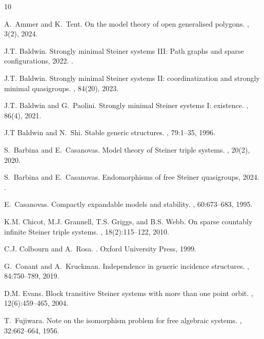 \documentclass[a4paper, 11pt]{article}
\theoremstyle{note}
\begin{document}
\begin{thebibliography}{10}

A.~Ammer and K.~Tent.
\newblock On the model theory of open generalised polygons.
, 3(2), 2024.

J.T. Baldwin.
\newblock Strongly minimal {S}teiner systems {III}: Path graphs and sparse
  configurations, 2022.
  .
  
J.T. Baldwin.
\newblock Strongly minimal {S}teiner systems {II}: coordinatization and
  strongly minimal quasigroups.
, 84(20), 2023.

J.T. Baldwin and G.~Paolini.
\newblock Strongly minimal {S}teiner systems {I}: existence.
, 86(4), 2021.

J.T Baldwin and N.~Shi.
\newblock Stable generic structures.
, 79:1--35, 1996.

S.~Barbina and E.~Casanovas.
\newblock Model theory of {S}teiner triple systems.
, 20(2), 2020.

S.~Barbina and E.~Casanovas.
\newblock Endomorphisms of free {S}teiner quasigroups, 2024.
.

E.~Casanovas.
\newblock Compactly expandable models and stability.
, 60:673--683, 1995.

K.M. Chicot, M.J. Grannell, T.S. Griggs, and B.S. Webb.
\newblock On sparse countably infinite {S}teiner triple systems.
, 18(2):115--122, 2010.

C.J. Colbourn and A.~Rosa.
.
\newblock Oxford University Press, 1999.

G.~Conant and A.~Kruckman.
\newblock Independence in generic incidence structures.
, 84:750--789, 2019.

D.M. Evans.
\newblock Block transitive {S}teiner systems with more than one point orbit.
, 12(6):459--465, 2004.

T.~Fujiwara.
\newblock Note on the isomorphism problem for free algebraic systems.
, 32:662--664, 1956.


\end{thebibliography}
\end{document}
